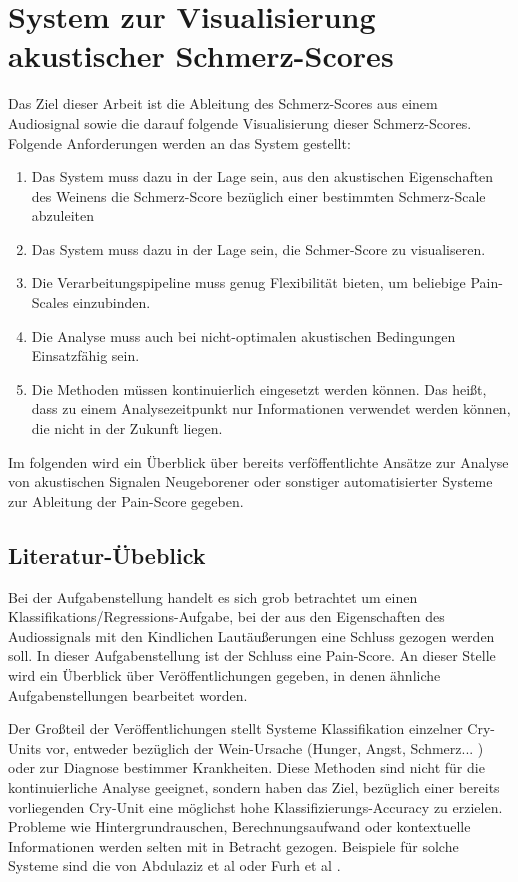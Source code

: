 \chapter{System zur Visualisierung akustischer Schmerz-Scores}


Das Ziel dieser Arbeit ist die Ableitung des Schmerz-Scores aus einem Audiosignal sowie die darauf folgende Visualisierung dieser Schmerz-Scores. Folgende Anforderungen werden an das System gestellt:
\begin{enumerate}
	\item Das System muss dazu in der Lage sein, aus den akustischen Eigenschaften des Weinens die Schmerz-Score bezüglich einer bestimmten Schmerz-Scale abzuleiten
	\item Das System muss dazu in der Lage sein, die Schmer-Score zu visualiseren.
	\item Die Verarbeitungspipeline muss genug Flexibilität bieten, um beliebige Pain-Scales einzubinden. 
	\item Die Analyse muss auch bei nicht-optimalen akustischen Bedingungen Einsatzfähig sein.
	\item Die Methoden müssen kontinuierlich eingesetzt werden können. Das heißt, dass zu einem Analysezeitpunkt nur Informationen verwendet werden können, die nicht in der Zukunft liegen.
\end{enumerate}

Im folgenden wird ein Überblick über bereits verföffentlichte Ansätze zur Analyse von akustischen Signalen Neugeborener oder sonstiger automatisierter Systeme zur Ableitung der Pain-Score gegeben.

\section{Literatur-Übeblick}
\label{sec:system_literature}

Bei der Aufgabenstellung handelt es sich grob betrachtet um einen Klassifikations/Regressions-Aufgabe, bei der aus den Eigenschaften des Audiossignals mit den Kindlichen Lautäußerungen eine Schluss gezogen werden soll. In dieser Aufgabenstellung ist der Schluss eine Pain-Score. An dieser Stelle wird ein Überblick über Veröffentlichungen gegeben, in denen ähnliche Aufgabenstellungen bearbeitet worden.

Der Großteil der Veröffentlichungen stellt Systeme Klassifikation einzelner Cry-Units vor, entweder bezüglich der Wein-Ursache (Hunger, Angst, Schmerz... ) oder zur Diagnose bestimmer Krankheiten. Diese Methoden sind nicht für die kontinuierliche Analyse geeignet, sondern haben das Ziel, bezüglich einer bereits vorliegenden Cry-Unit eine möglichst hohe Klassifizierungs-Accuracy zu erzielen. Probleme wie Hintergrundrauschen, Berechnungsaufwand oder kontextuelle Informationen werden selten mit in Betracht gezogen. Beispiele für solche Systeme sind die von Abdulaziz et al \cite{class_abdulaziz} oder Furh et al \cite{comparisonOfLearning}.

